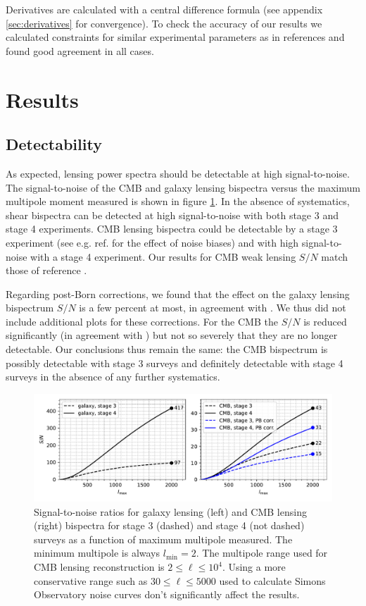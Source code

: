 \documentclass[11pt]{article} %
\begin{document}
Derivatives are calculated with a central difference formula (see appendix \ref{sec:derivatives} for convergence).  To check the accuracy of our results we calculated constraints for similar experimental parameters as in references \cite{Planck2018Lensing, Takada2003, cmbs4sciencebook,neutrinoconstraints} and found good agreement in all cases.

\section{Results}\label{sec:results}
\subsection{Detectability}
As expected, lensing power spectra should be detectable at high signal-to-noise. 
The signal-to-noise of the CMB and galaxy lensing bispectra versus the maximum multipole moment measured is shown in figure \ref{fig:snrplots}. In the absence of systematics, shear bispectra can be detected at high signal-to-noise with both stage 3 and stage 4 experiments. CMB lensing bispectra could be  detectable by a stage 3 experiment (see e.g. ref. \cite{Kalaja_2023} for the effect of noise biases) and with high signal-to-noise with a stage 4 experiment. Our results for CMB weak lensing $S/N$ match those of reference \cite{Namikawa_2016}.

Regarding post-Born corrections, we found that the effect on the galaxy lensing bispectrum $S/N$ is a few percent at most, in agreement with \cite{galpostbornlbscorr}. We thus did not include additional plots for these corrections. For the CMB the $S/N$ is reduced significantly (in agreement with \cite{postborn_pratten_lewis}) but not so severely that they are no longer detectable. Our conclusions thus remain the same: the CMB bispectrum is possibly detectable with stage 3 surveys and definitely detectable with stage 4 surveys in the absence of any further systematics.

\begin{figure}[h!]
    \includegraphics[width=\textwidth]{figures/snrplots.pdf}
    \caption{Signal-to-noise ratios for galaxy lensing (left) and CMB lensing (right) bispectra for stage 3 (dashed) and stage 4 (not dashed) surveys as a function of maximum multipole measured. The minimum multipole is always $l_{\text{min}}=2$. The multipole range used for CMB lensing reconstruction is $2\leq \ell \leq 10^4$. Using a more conservative range such as $30\leq \ell \leq 5000$ used to calculate Simons Observatory noise curves don't significantly affect the results.}
    \label{fig:snrplots}
\end{figure}
\end{document}
